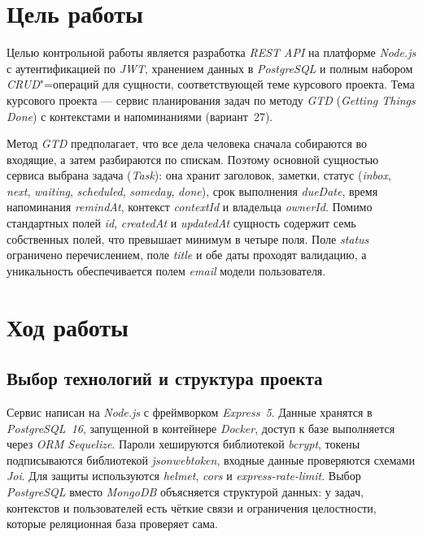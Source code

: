 \documentclass{stp}
\newcommand{\en}[1]{\textit{#1}}
\begin{document}

\section{Цель работы}

Целью контрольной работы является разработка \en{REST API} на платформе
\en{Node.js} с аутентификацией по \en{JWT}, хранением данных в
\en{PostgreSQL} и полным набором \en{CRUD}"=операций для сущности,
соответствующей теме курсового проекта. Тема курсового проекта --- сервис
планирования задач по методу \en{GTD} (\en{Getting Things Done}) с
контекстами и напоминаниями (вариант~27).

Метод \en{GTD} предполагает, что все дела человека сначала собираются во
входящие, а затем разбираются по спискам. Поэтому основной сущностью
сервиса выбрана задача (\en{Task}): она хранит заголовок, заметки, статус
(\en{inbox}, \en{next}, \en{waiting}, \en{scheduled}, \en{someday},
\en{done}), срок выполнения \en{dueDate}, время напоминания \en{remindAt},
контекст \en{contextId} и владельца \en{ownerId}. Помимо стандартных полей
\en{id}, \en{createdAt} и \en{updatedAt} сущность содержит семь собственных
полей, что превышает минимум в четыре поля. Поле \en{status} ограничено
перечислением, поле \en{title} и обе даты проходят валидацию, а уникальность
обеспечивается полем \en{email} модели пользователя.

\section{Ход работы}\label{sec:work}

\subsection{Выбор технологий и структура проекта}

Сервис написан на \en{Node.js} с фреймворком \en{Express~5}. Данные хранятся
в \en{PostgreSQL~16}, запущенной в контейнере \en{Docker}, доступ к базе
выполняется через \en{ORM Sequelize}. Пароли хешируются библиотекой
\en{bcrypt}, токены подписываются библиотекой \en{jsonwebtoken}, входные
данные проверяются схемами \en{Joi}. Для защиты используются \en{helmet},
\en{cors} и \en{express-rate-limit}. Выбор \en{PostgreSQL} вместо
\en{MongoDB} объясняется структурой данных: у задач, контекстов и
пользователей есть чёткие связи и ограничения целостности, которые
реляционная база проверяет сама.
\end{document}
